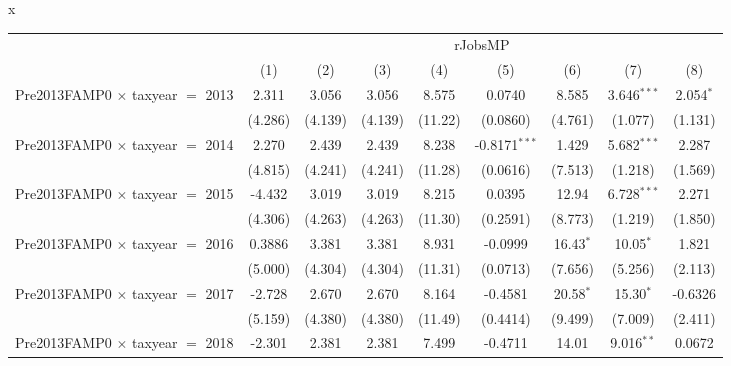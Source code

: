 x
\begingroup
\centering
\begin{tabular}{lcccccccc}
   \toprule
    & \multicolumn{8}{c}{rJobsMP}\\
                                           & (1)           & (2)           & (3)           & (4)           & (5)             & (6)           & (7)           & (8)\\  
   \midrule 
   Pre2013FAMP0 $\times$ taxyear $=$ 2013  & 2.311         & 3.056         & 3.056         & 8.575         & 0.0740          & 8.585         & 3.646$^{***}$ & 2.054$^{*}$\\   
                                           & (4.286)       & (4.139)       & (4.139)       & (11.22)       & (0.0860)        & (4.761)       & (1.077)       & (1.131)\\   
   Pre2013FAMP0 $\times$ taxyear $=$ 2014  & 2.270         & 2.439         & 2.439         & 8.238         & -0.8171$^{***}$ & 1.429         & 5.682$^{***}$ & 2.287\\   
                                           & (4.815)       & (4.241)       & (4.241)       & (11.28)       & (0.0616)        & (7.513)       & (1.218)       & (1.569)\\   
   Pre2013FAMP0 $\times$ taxyear $=$ 2015  & -4.432        & 3.019         & 3.019         & 8.215         & 0.0395          & 12.94         & 6.728$^{***}$ & 2.271\\   
                                           & (4.306)       & (4.263)       & (4.263)       & (11.30)       & (0.2591)        & (8.773)       & (1.219)       & (1.850)\\   
   Pre2013FAMP0 $\times$ taxyear $=$ 2016  & 0.3886        & 3.381         & 3.381         & 8.931         & -0.0999         & 16.43$^{*}$   & 10.05$^{*}$   & 1.821\\   
                                           & (5.000)       & (4.304)       & (4.304)       & (11.31)       & (0.0713)        & (7.656)       & (5.256)       & (2.113)\\   
   Pre2013FAMP0 $\times$ taxyear $=$ 2017  & -2.728        & 2.670         & 2.670         & 8.164         & -0.4581         & 20.58$^{*}$   & 15.30$^{*}$   & -0.6326\\   
                                           & (5.159)       & (4.380)       & (4.380)       & (11.49)       & (0.4414)        & (9.499)       & (7.009)       & (2.411)\\   
   Pre2013FAMP0 $\times$ taxyear $=$ 2018  & -2.301        & 2.381         & 2.381         & 7.499         & -0.4711         & 14.01         & 9.016$^{**}$  & 0.0672\\   

\end{tabular}

